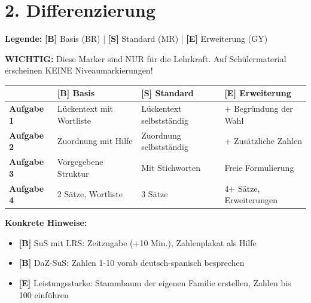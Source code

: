 \documentclass[11pt, a4paper]{article}
\newcommand{\B}{\textcolor{basis}{\textbf{[B]}}}
\newcommand{\Std}{\textcolor{standard}{\textbf{[S]}}}
\newcommand{\E}{\textcolor{erweiterung}{\textbf{[E]}}}
\begin{document}

\section*{2. Differenzierung}

\begin{differenzierung}
\textbf{Legende:} \B{} Basis (BR) | \Std{} Standard (MR) | \E{} Erweiterung (GY)

\vspace{0.5em}

\textbf{WICHTIG:} Diese Marker sind NUR für die Lehrkraft. Auf Schülermaterial erscheinen KEINE Niveaumarkierungen!
\end{differenzierung}

\vspace{1em}

\begin{tabularx}{\textwidth}{|l|X|X|X|}
\hline
& \B{} \textbf{Basis} & \Std{} \textbf{Standard} & \E{} \textbf{Erweiterung} \\
\hline
\textbf{Aufgabe 1} & Lückentext mit Wortliste & Lückentext selbstständig & + Begründung der Wahl \\
\hline
\textbf{Aufgabe 2} & Zuordnung mit Hilfe & Zuordnung selbstständig & + Zusätzliche Zahlen \\
\hline
\textbf{Aufgabe 3} & Vorgegebene Struktur & Mit Stichworten & Freie Formulierung \\
\hline
\textbf{Aufgabe 4} & 2 Sätze, Wortliste & 3 Sätze & 4+ Sätze, Erweiterungen \\
\hline
\end{tabularx}

\vspace{1em}

\textbf{Konkrete Hinweise:}
\begin{itemize}
    \item \B{} SuS mit LRS: Zeitzugabe (+10 Min.), Zahlenplakat als Hilfe
    \item \B{} DaZ-SuS: Zahlen 1-10 vorab deutsch-spanisch besprechen
    \item \E{} Leistungsstarke: Stammbaum der eigenen Familie erstellen, Zahlen bis 100 einführen
\end{itemize}

\end{document}
